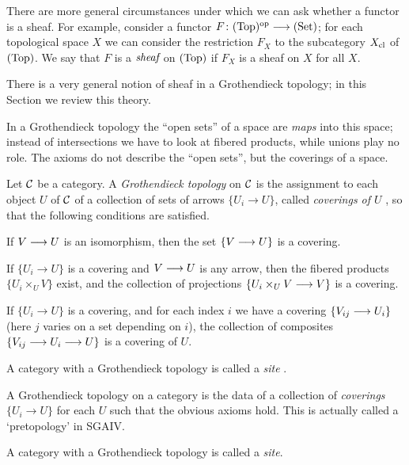 \begin{2   CONTRAVARIANT FUNCTORS}
\begin{2.3 Sheaves in Grothendieck topologies}
There are more general circumstances under which we can ask whether a functor is a sheaf. For example, consider a functor $F \colon \cattop\op \arr \catset$; for each topological space $X$ we can consider the restriction $F_X$ to the subcategory $X_\mathrm{cl}$ of $(\mathrm{Top})$. We say that $F$ is a $\emph{sheaf}$ on $(\mathrm{Top})$ if $F_X$ is a sheaf on $X$ for all $X$.

There is a very general notion of  sheaf in a Grothendieck topology; in this Section we review this theory.

In a Grothendieck topology the ``open sets'' of a space are \emph{maps} into this space; instead of intersections we have to look at fibered products, while unions play no role. The axioms do not describe the ``open sets'', but the coverings of a space.

\begin{definition}
Let $\mathcal{C}$ be a category. A \emph{Grothendieck topology}%
%
 on $\mathcal{C}$ is the assignment to each object $U$ of $\mathcal{C}$ of a collection of sets of arrows $\{U_i \to U\}$, called \emph{coverings of $U$}%
, so that the following conditions are satisfied.

\begin{enumeratei}

 If $V \arr U$ is an isomorphism, then the set $\{V \arr U\}$ is a covering.

 If $\{U_i \to U\}$ is a covering and $V \arr U$ is any arrow, then the fibered products $\{U_i \times_U V\}$ exist,  and the collection of projections $\{U_i \times_U V \arr V \}$ is a covering.

 If $\{U_i \to U\}$ is a covering, and for each index $i$ we have a covering $\{V_{ij} \arr U_i\}$ (here $j$ varies on a set depending on $i$), the collection of composites $\{V_{ij} \arr U_i \arr U\}$ is a covering of $U$.

\end{enumeratei}

A category with a Grothendieck topology is called a \emph{site}%
.
\end{definition}
\begin{shaded}
A Grothendieck topology on a category is the data of a collection of \textit{coverings} $\{U_i\to U\}$ for each $U$ such that the obvious axioms hold. This is actually called a `pretopology' in SGAIV.

A category with a Grothendieck topology is called a \emph{site}.
\end{shaded}



\end{2.3 Sheaves in Grothendieck topologies}
\end{2   CONTRAVARIANT FUNCTORS}
